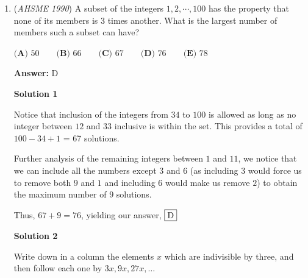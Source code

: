 \begin{enumerate}
 The area of $\triangle BCD$ is $\frac{1}{2}(90)(130)\sin\theta = 5850 \sin \theta$, while the area of $\triangle BAD$ is $\frac{1}{2}(70)(110)\sin(180^\circ - \theta) = 3850 \sin \theta$.  So the total area of $ABCD$ is $9700 \sin \theta = 300\sqrt{1001}$.

 Let $r$ be the inradius of $ABCD$.  Then $\frac{1}{2}r(70+90+130+110) = 300\sqrt{1001}$, so $r = \frac{3\sqrt{1001}}{2}$.

 Let $O$ be the incenter of $ABCD$, and $T$ be the foot of the perpendicular from $O$ to $CD$.  Then $\angle OCT = \frac{\theta}{2}$.  Without loss of generality, suppose $x = CT$ and $y = DT$. Then $\frac{r}{x} = \tan \frac{\theta}{2} = \frac{\sin \theta}{1 + \cos \theta} = \frac{\sqrt{1001}}{39}$.  So $x = \frac{39r}{\sqrt{1001}} = \frac{117}{2}$ and $y = 130 - \frac{117}{2} = \frac{143}{2}$.  

 Therefore, $|x-y| = \left|\frac{117}{2}-\frac{143}{2}\right| = \boxed{\textbf{(B)}\ 13}$.

 


	\item (\textit{AHSME 1990}) A subset of the integers $1,2,\cdots,100$ has the property that none of its members is 3 times another. What is the largest number of members such a subset can have?


 $\textbf{(A) } 50\qquad \textbf{(B) } 66\qquad \textbf{(C) } 67\qquad \textbf{(D) } 76\qquad \textbf{(E) } 78$

 \textbf{Answer: }D



\textbf{Solution 1}

Notice that inclusion of the integers from $34$ to $100$ is allowed as long as no integer between $12$ and $33$ inclusive is within the set. This provides a total of $100 - 34 + 1$ = 67 solutions. 

 Further analysis of the remaining integers between $1$ and $11$, we notice that we can include all the numbers except $3$ and $6$ (as including $3$ would force us to remove both $9$ and $1$ and including $6$ would make us remove $2$) to obtain the maximum number of  $9$ solutions. 

 Thus, $67 + 9 = 76$, yielding our answer, $\fbox{D}$




\textbf{Solution 2}

Write down in a column the elements $x$ which are indivisible by three, and then follow each one by $3x, 9x, 27x, \ldots$


\end{enumerate}
